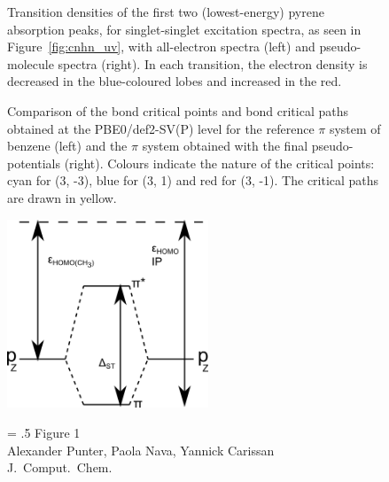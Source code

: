 \documentclass[12pt]{article}
\begin{document}
\begin{figure}
\caption{Transition densities of the first two (lowest-energy) pyrene absorption peaks, for singlet-singlet excitation spectra, as seen in Figure~\ref{fig:cnhn_uv}, with all-electron spectra (left) and pseudo-molecule spectra (right). In each transition, the electron density is decreased in the blue-coloured lobes and increased in the red.}
\label{fig:transitiondensities}
\end{figure}

\begin{figure}
\caption{Comparison of the bond critical points and bond critical paths obtained at the PBE0/def2-SV(P)
level for the
reference $\pi$ system of benzene (left) and the $\pi$ system obtained with the final pseudo-potentials (right).
Colours indicate the nature of the critical points: cyan for (3, -3), blue for (3, 1) and red for (3, -1).
The critical paths are drawn in yellow.}
\label{fig:aim_c6h6}
\end{figure}

\clearpage

\begin{figure}
\begin{center}
\includegraphics[width=6cm]{diagram.png}
\end{center}
{\Large
\begin{minipage}[t]{3in}
\baselineskip = .5\baselineskip
Figure 1 \\
Alexander Punter, Paola Nava, Yannick Carissan\\
J.\ Comput.\ Chem.
\end{minipage}
}
\end{figure}

\clearpage
\end{document}
